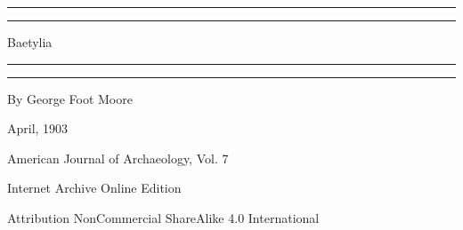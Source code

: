 \documentclass[a4paper, 12pt, oneside, polutonikogreek, english]{article}
\begin{document}
\begin{titlepage} %
	\centering %
	\scshape %

	
	\rule{\textwidth}{1.6pt}\vspace*{-\baselineskip}\vspace*{2pt} %
	\rule{\textwidth}{0.4pt} %
	
	\vspace{0.75\baselineskip} %

        {\Huge Baetylia} %
	
	\vspace{0.75\baselineskip} %
	
	\rule{\textwidth}{0.4pt}\vspace*{-\baselineskip}\vspace{3.2pt} %
	\rule{\textwidth}{1.6pt} %
	
	\vspace{1\baselineskip} %
	
	
	{By \large George Foot Moore} %
	
	\vspace*{1\baselineskip} %
	
	
	\vspace{1\baselineskip} %

	
	
		
	\vspace*{\fill}%
	
	{\small April, 1903}%
	
	{\small American Journal of Archaeology, Vol. 7} %

	\vspace{1\baselineskip} %

    Internet Archive Online Edition  %
	
	{\small Attribution NonCommercial ShareAlike 4.0 International } %
\end{titlepage}
\clearpage
\large
\end{document}
